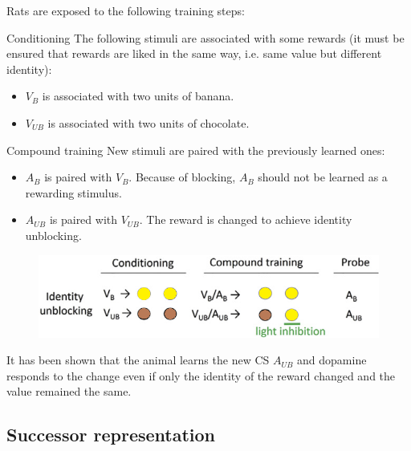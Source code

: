 \begin{casestudy}
    Rats are exposed to the following training steps:
    \begin{descriptionlist}
        \item[Conditioning] 
            The following stimuli are associated with some rewards
            (it must be ensured that rewards are liked in the same way, i.e. same value but different identity):
            \begin{itemize}
                \item $V_B$ is associated with two units of banana.
                \item $V_{UB}$ is associated with two units of chocolate.
            \end{itemize}

        \item[Compound training]
            New stimuli are paired with the previously learned ones:
            \begin{itemize}
                \item $A_B$ is paired with $V_B$. Because of blocking, $A_B$ should not be learned as a rewarding stimulus.
                \item $A_{UB}$ is paired with $V_{UB}$. The reward is changed to achieve identity unblocking.
            \end{itemize}
    \end{descriptionlist}

    \begin{figure}[H]
        \centering
        \includegraphics[width=0.6\linewidth]{./img/dopamine_general1.png}
    \end{figure}

    It has been shown that the animal learns the new CS $A_{UB}$ and dopamine responds to the change even if only the identity of the reward changed and the value remained the same.
\end{casestudy}


\subsection{Successor representation}

